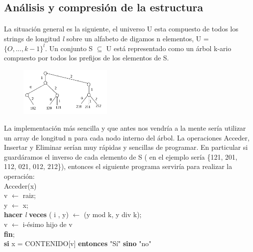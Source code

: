 \documentclass[es]{ifirak}
\begin{document}
\subsection{Análisis y compresión de la estructura}
\large{
\paragraph{}
La situación general es la siguiente, el universo U esta compuesto de todos los strings de longitud \textit{l} sobre un alfabeto de digamos n elementos, U = $\{O,..., k-1\}^{l}$. Un conjunto S $\subseteq $ U está representado como un árbol k-ario compuesto por todos los prefijos de los elementos de S.\\

\begin{figure}[hbtp]
	\centering
	\includegraphics[width=0.4\textwidth]{trie2.png}
\end{figure}

La implementación más sencilla y que antes nos vendría a la mente sería utilizar un array de longitud n para cada nodo interno del árbol. La operaciones Acceder, Insertar y Eliminar serían muy rápidas y sencillas de programar. En particular si guardáramos el inverso de cada elemento de S ( en el ejemplo sería \{121, 201, 112, 021, 012, 212\}), entonces el siguiente programa serviría para realizar la operación:\\

Acceder(x)\\
	\hspace*{1.5cm} v $\leftarrow$  raiz;\\
	\hspace*{1.5cm} y $\leftarrow$ x;\\
	\hspace*{1.5cm} \textbf{hacer} \textit{l} \textbf{veces} ( i , y) $\leftarrow$ (y mod k, y div k);\\
	\hspace*{2.5cm}	v $\leftarrow$ i-ésimo hijo de v\\
	\hspace*{1.5cm} \textbf{fin};\\
	\hspace*{1.5cm} \textbf{si} x = CONTENIDO[v] \textbf{entonces} "Sí" \textbf{sino} "no"\\
	
}
\end{document}
